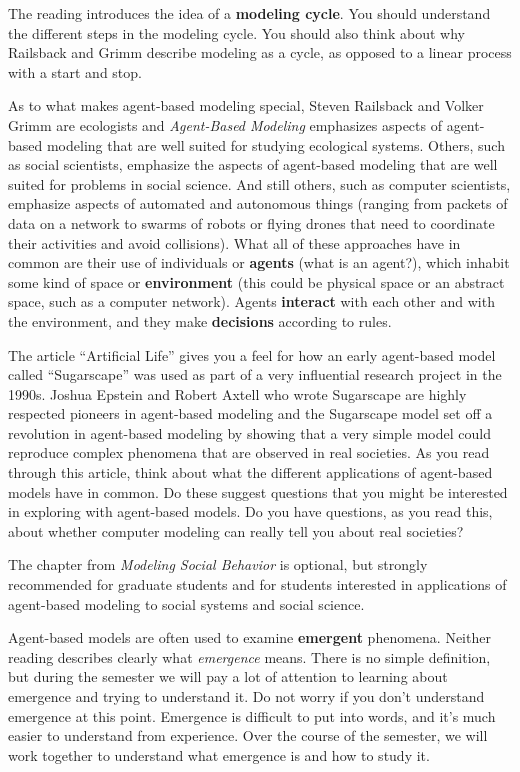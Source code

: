 \documentclass[
]{article}
\begin{document}
The reading introduces the idea of a \textbf{modeling cycle}. You should
understand the different steps in the modeling cycle. You should also
think about why Railsback and Grimm describe modeling as a cycle, as
opposed to a linear process with a start and stop.

As to what makes agent-based modeling special, Steven Railsback and
Volker Grimm are ecologists and \emph{Agent-Based Modeling} emphasizes
aspects of agent-based modeling that are well suited for studying
ecological systems. Others, such as social scientists, emphasize the
aspects of agent-based modeling that are well suited for problems in
social science. And still others, such as computer scientists, emphasize
aspects of automated and autonomous things (ranging from packets of data
on a network to swarms of robots or flying drones that need to
coordinate their activities and avoid collisions). What all of these
approaches have in common are their use of individuals or
\textbf{agents} (what is an agent?), which inhabit some kind of space or
\textbf{environment} (this could be physical space or an abstract space,
such as a computer network). Agents \textbf{interact} with each other
and with the environment, and they make \textbf{decisions} according to
rules.

The article ``Artificial Life'' gives you a feel for how an early
agent-based model called ``Sugarscape'' was used as part of a very
influential research project in the 1990s. Joshua Epstein and Robert
Axtell who wrote Sugarscape are highly respected pioneers in agent-based
modeling and the Sugarscape model set off a revolution in agent-based
modeling by showing that a very simple model could reproduce complex
phenomena that are observed in real societies. As you read through this
article, think about what the different applications of agent-based
models have in common. Do these suggest questions that you might be
interested in exploring with agent-based models. Do you have questions,
as you read this, about whether computer modeling can really tell you
about real societies?

The chapter from \emph{Modeling Social Behavior} is optional, but
strongly recommended for graduate students and for students interested
in applications of agent-based modeling to social systems and social
science.

Agent-based models are often used to examine \textbf{emergent}
phenomena. Neither reading describes clearly what \emph{emergence}
means. There is no simple definition, but during the semester we will
pay a lot of attention to learning about emergence and trying to
understand it. Do not worry if you don't understand emergence at this
point. Emergence is difficult to put into words, and it's much easier to
understand from experience. Over the course of the semester, we will
work together to understand what emergence is and how to study it.
\end{document}
